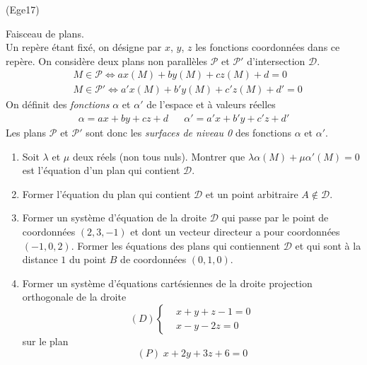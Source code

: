 \begin{tiny}(Ege17)\end{tiny} Faisceau de plans.\\
Un repère étant fixé, on désigne par $x$, $y$, $z$ les fonctions coordonnées dans ce repère. On considère deux plans non parallèles $\mathcal{P}$ et $\mathcal{P}'$ d'intersection $\mathcal D$.
\begin{align*}
 &M\in \mathcal{P} \Leftrightarrow ax(M)+by(M)+cz(M)+d = 0 \\
 &M\in \mathcal{P}' \Leftrightarrow a'x(M)+b'y(M)+c'z(M)+d' = 0 
\end{align*}
On définit des \emph{fonctions} $\alpha$ et $\alpha'$ de l'espace et à valeurs réelles
\begin{align*}
 \alpha = ax+by+cz+d & & \alpha' = a'x+b'y+c'z+d' 
\end{align*}
Les plans $\mathcal{P}$ et $\mathcal{P}'$ sont donc les \emph{surfaces de niveau 0} des fonctions $\alpha$ et $\alpha'$.
\begin{enumerate}
 \item Soit $\lambda$ et $\mu$ deux réels (non tous nuls). Montrer que $\lambda \alpha(M)+\mu\alpha'(M)=0$ est l'équation d'un plan qui contient $\mathcal{D}$.
 \item Former l'équation du plan qui contient $\mathcal{D}$ et un point arbitraire $A\not\in \mathcal D$.
 \item Former un système d'équation de la droite $\mathcal D$ qui passe par le point de coordonnées $(2,3,-1)$ et dont un vecteur directeur a pour coordonnées $(-1,0,2)$. Former les équations des plans qui contiennent $\mathcal D$ et qui sont à la distance $1$ du point $B$ de coordonnées $(0,1,0)$.
 \item Former un système d'équations cartésiennes de la droite projection orthogonale de la droite
\begin{displaymath}
 (D) \left\lbrace 
\begin{aligned}
 &x+y+z-1 =0\\
 &x-y-2z = 0
\end{aligned}
\right. 
\end{displaymath}
sur le plan
\begin{displaymath}
 (P)\;x+2y+3z+6 = 0
\end{displaymath}

\end{enumerate}
